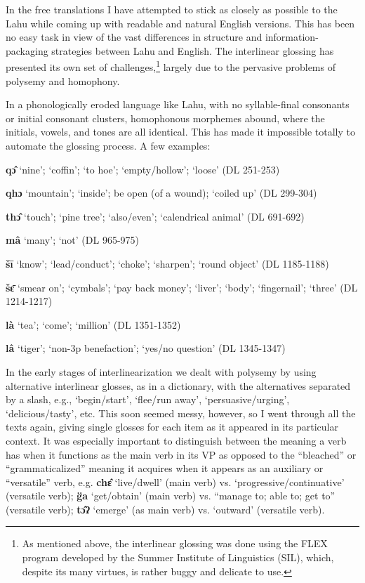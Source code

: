 In the free translations I have attempted to stick as closely as
possible to the Lahu while coming up with readable and natural English
versions. This has been no easy task in view of the vast differences in
structure and information-packaging strategies between Lahu and English.
The interlinear glossing has presented its own set of
challenges,\footnote{As mentioned above, the interlinear glossing was
  done using the FLEX program developed by the Summer Institute of
  Linguistics (SIL), which, despite its many virtues, is rather buggy
  and delicate to use.} largely due to the pervasive problems of
polysemy and homophony.

In a phonologically eroded language like Lahu, with no syllable-final
consonants or initial consonant clusters, homophonous morphemes abound,
where the initials, vowels, and tones are all identical. This has made
it impossible totally to automate the glossing process. A few examples:

\textbf{qɔ̂} `nine'; `coffin'; `to hoe'; `empty/hollow'; `loose' (DL
251-253)

\textbf{qhɔ} `mountain'; `inside'; be open (of a wound); `coiled up'
(DL 299-304)

\textbf{thɔ̂} `touch'; `pine tree'; `also/even'; `calendrical animal' (DL
691-692)

\textbf{mâ} `many'; `not' (DL 965-975)

\textbf{šī} `know'; `lead/conduct'; `choke'; `sharpen'; `round object'
(DL 1185-1188)

\textbf{šɛ̄} `smear on'; `cymbals'; `pay back money'; `liver'; `body';
`fingernail'; `three' (DL 1214-1217)

\textbf{là} `tea'; `come'; `million' (DL 1351-1352)

\textbf{lâ} `tiger'; `non-3p benefaction'; `yes/no question' (DL
1345-1347)

In the early stages of interlinearization we dealt with polysemy by
using alternative interlinear glosses, as in a dictionary, with the
alternatives separated by a slash, e.g., `begin/start', `flee/run away',
`persuasive/urging', `delicious/tasty', etc. This soon seemed messy,
however, so I went through all the texts again, giving single glosses
for each item as it appeared in its particular context. It was
especially important to distinguish between the meaning a verb has when
it functions as the main verb in its VP as opposed to the ``bleached'' or
``grammaticalized'' meaning it acquires when it appears as an auxiliary or
``versatile'' verb, e.g. \textbf{chɛ̂} `live/dwell' (main verb) vs.
`progressive/continuative' (versatile verb); \textbf{g̈a} `get/obtain'
(main verb) vs. ``manage to; able to; get to'' (versatile verb);
\textbf{tɔ̂ʔ} `emerge' (as main verb) vs. `outward' (versatile verb).

